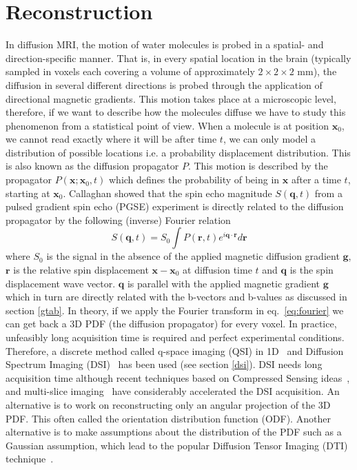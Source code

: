 \documentclass{bioinfo}
\begin{document}
\section{Reconstruction}\label{reconstruction}

In diffusion MRI, the motion of water molecules is probed in a spatial- and
direction-specific manner. That is, in every spatial location in the brain
(typically sampled in voxels each covering a volume of approximately
$2\times2\times2$ mm), the diffusion in several different directions is probed
through the application of directional magnetic gradients. This motion takes
place at a microscopic level, therefore, if we want to describe how the
molecules diffuse we have to study this phenomenon from a statistical
point of view. When a molecule is at position $\mathbf{x}_{0}$, we cannot read
exactly where it will be after time $t$, we can only model a distribution of
possible locations i.e. a probability displacement distribution. This is also
known as the diffusion propagator $P$. This motion is described by the
propagator $P(\mathbf{x};\mathbf{x}_{0},t)$ which defines the probability of
being in $\mathbf{x}$ after a time $t$, starting at $\mathbf{x}_{0}$. Callaghan
\citep{callaghan:91} showed that the spin echo magnitude
$S(\mathbf{q},t)$ from a pulsed gradient spin echo (PGSE) experiment is
directly related to the diffusion propagator by the following (inverse) Fourier
relation
\begin{equation}
S(\mathbf{q},t)=S_{0}\int P(\mathbf{r},t)e^{i\mathbf{q}\cdot\mathbf{r}}d\mathbf{r}\label{eq:fourier}
\end{equation}
\noindent where $S_{0}$ is the signal in the absence of the applied magnetic
diffusion gradient $\mathbf{g}$, $\mathbf{r}$ is the relative spin displacement
$\mathbf{x}-\mathbf{x}_{0}$ at diffusion time $t$ and $\mathbf{q}$ is the spin
displacement wave vector. $\mathbf{q}$ is parallel with the applied magnetic
gradient $\mathbf{g}$ which in turn are directly related with the b-vectors
and b-values as discussed in section \ref{gtab}.  In theory, if we apply the Fourier
transform in eq.~\ref{eq:fourier} we can get back a 3D PDF (the diffusion
propagator) for every voxel. In practice, unfeasibly long acquisition time is
required and perfect experimental conditions. Therefore, a discrete method
called q-space imaging (QSI) in 1D~\citep{callaghan-eccles-etal:1988}
and Diffusion  Spectrum Imaging (DSI)~\citep{wedeen2005mapping} has been used (see section
\ref{dsi}).
DSI needs long acquisition time although recent techniques based on
Compressed Sensing
ideas~\citep{menzel-tan-etal:11,bilgic2012accelerated,gramfort-etal-media:13},
and multi-slice imaging~\citep{Setsompop2012569} have
considerably accelerated the DSI acquisition. An alternative is to
work on reconstructing only an angular projection of the 3D PDF. This
often called the orientation distribution function (ODF). Another
alternative is to make assumptions about the distribution of the PDF
such as a Gaussian assumption, which lead to
the popular Diffusion Tensor Imaging (DTI)
technique~\citep{basser-mattiello-etal:94}.
\end{document}
